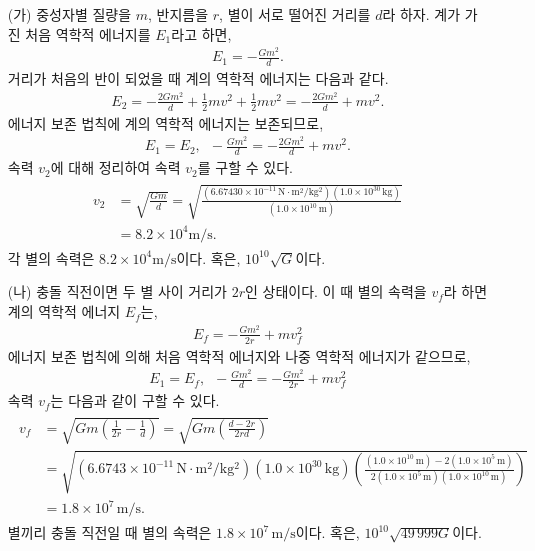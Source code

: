 \documentclass[floatfix,nofootinbib,superscriptaddress,fleqn]{revtex4-2}
\begin{document}
\begin{itemize}
  \item[(가)]
 중성자별 질량을 $m$, 반지름을 $r$, 
별이 서로 떨어진 거리를 $d$라 하자. 
계가 가진 처음 역학적 에너지를 $E_1$라고 하면,
\begin{align}
    E_1 = -\frac{Gm^2}{d}.
\end{align}
거리가 처음의 반이 되었을 때 계의 역학적 에너지는 다음과 같다.
\begin{align}
    E_2 = -\frac{2Gm^2}{d}+ \frac{1}{2}mv^2+\frac{1}{2}mv^2
    =-\frac{2Gm^2}{d}+ mv^2.
\end{align}
에너지 보존 법칙에 계의 역학적 에너지는 보존되므로,
\begin{align}
    E_1=E_2,\,\,\,-\frac{Gm^2}{d}=-\frac{2Gm^2}{d}+ mv^2.
\end{align}
속력 $v_2$에 대해 정리하여 속력 $v_2$를 구할 수 있다.
\begin{align}
    \begin{split}
        v_2 &= \sqrt{\frac{Gm}{d}} 
        =\sqrt{\frac{(6.67430\times 10^{-11}\,\mathrm{N\cdot m^2/kg^2})
        (1.0\times 10^{30}\,\mathrm{kg})}{(1.0\times 10^{10}\,\mathrm{m})}} \\
        &=8.2\times 10^4\mathrm{m/s}.
    \end{split}
\end{align}
각 별의 속력은 $8.2\times 10^4\mathrm{m/s}$이다. 혹은, $10^{10}\sqrt{G}$이다.
  \item[(나)] 
  충돌 직전이면 두 별 사이 거리가 $2r$인 상태이다. 이 때 별의 속력을 $v_f$라 하면 
계의 역학적 에너지 $E_f$는,
\begin{align}
    E_f =-\frac{Gm^2}{2r} + mv_f^2
\end{align}
에너지 보존 법칙에 의해 처음 역학적 에너지와 나중 역학적 에너지가 같으므로,
\begin{align}
    E_1 = E_f,\,\,\, -\frac{Gm^2}{d}=-\frac{Gm^2}{2r} + mv_f^2
\end{align}
속력 $v_f$는 다음과 같이 구할 수 있다.
\begin{align}
    \begin{split}
        v_f&=\sqrt{Gm\left(\frac{1}{2r}-\frac{1}{d}\right)}=\sqrt{Gm\left(\frac{d-2r}{2rd}\right)}  \\ 
        &=\sqrt{(6.6743\times 10^{-11}\,\mathrm{N\cdot m^2/kg^2})
        (1.0\times 10^{30}\,\mathrm{kg})
        \left(\frac{(1.0\times 10^{10}\,\mathrm{m})-2(1.0\times 10^{5}\,\mathrm{m})}
        {2(1.0\times 10^{5}\,\mathrm{m})(1.0\times 10^{10}\,\mathrm{m})}\right)} \\
        &=1.8\times 10^7\,\mathrm{m/s}.
    \end{split}
\end{align}
별끼리 충돌 직전일 때 별의 속력은 $1.8\times 10^7\,\mathrm{m/s}$이다. 
혹은, $10^{10}\sqrt{49\,999G}$이다.
\end{itemize}
\end{document}
